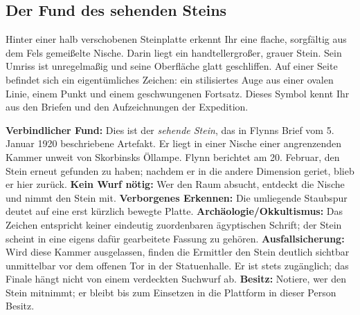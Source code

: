 \subsection{Der Fund des sehenden Steins}
\begin{vorlesetextalle}
Hinter einer halb verschobenen Steinplatte erkennt Ihr eine flache, sorgfältig aus dem Fels gemei\ss{}elte Nische. Darin liegt ein handtellergro\ss{}er, grauer Stein. Sein Umriss ist unregelma\ss{}ig und seine Oberfläche glatt geschliffen. Auf einer Seite befindet sich ein eigentümliches Zeichen: ein stilisiertes Auge aus einer ovalen Linie, einem Punkt und einem geschwungenen Fortsatz. Dieses Symbol kennt Ihr aus den Briefen und den Aufzeichnungen der Expedition.
\end{vorlesetextalle}
\begin{meisterinfo}
\textbf{Verbindlicher Fund:} Dies ist der \emph{sehende Stein}, das in Flynns Brief vom 5. Januar 1920 beschriebene Artefakt. Er liegt in einer Nische einer angrenzenden Kammer unweit von Skorbinsks Öllampe. Flynn berichtet am 20. Februar, den Stein erneut gefunden zu haben; nachdem er in die andere Dimension geriet, blieb er hier zurück. \textbf{Kein Wurf nötig:} Wer den Raum absucht, entdeckt die Nische und nimmt den Stein mit. \textbf{Verborgenes Erkennen:} Die umliegende Staubspur deutet auf eine erst kürzlich bewegte Platte. \textbf{Archäologie/Okkultismus:} Das Zeichen entspricht keiner eindeutig zuordenbaren ägyptischen Schrift; der Stein scheint in eine eigens dafür gearbeitete Fassung zu gehören. \textbf{Ausfallsicherung:} Wird diese Kammer ausgelassen, finden die Ermittler den Stein deutlich sichtbar unmittelbar vor dem offenen Tor in der Statuenhalle. Er ist stets zugänglich; das Finale hängt nicht von einem verdeckten Suchwurf ab. \textbf{Besitz:} Notiere, wer den Stein mitnimmt; er bleibt bis zum Einsetzen in die Plattform in dieser Person Besitz.
\end{meisterinfo}


